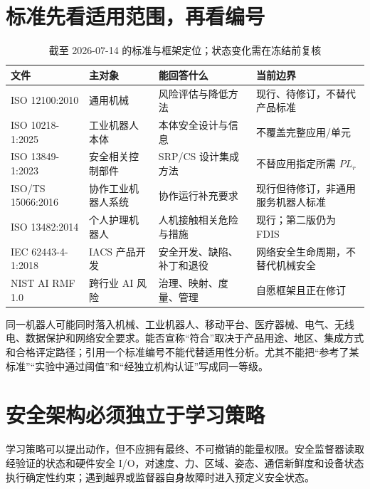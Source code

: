 \section{标准先看适用范围，再看编号}

\begin{table}[H]
\begingroup
{}
\centering
\caption{截至 2026-07-14 的标准与框架定位；状态变化需在冻结前复核}
\label{tab:safety-standards-scope}
\begin{tabularx}{\textwidth}{p{}YYp{0.20\textwidth}}
\toprule
文件 & 主对象 & 能回答什么 & 当前边界 \\
\midrule
ISO 12100:2010 & 通用机械 & 风险评估与降低方法 & 现行、待修订，不替代产品标准 \\
ISO 10218-1:2025 & 工业机器人本体 & 本体安全设计与信息 & 不覆盖完整应用/单元\cite{iso10218_1_2025} \\
ISO 13849-1:2023 & 安全相关控制部件 & SRP/CS 设计集成方法 & 不替应用指定所需 $PL_r$\cite{iso13849_1_2023} \\
ISO/TS 15066:2016 & 协作工业机器人系统 & 协作运行补充要求 & 现行但待修订，非通用服务机器人标准\cite{isots15066_2016} \\
ISO 13482:2014 & 个人护理机器人 & 人机接触相关危险与措施 & 现行；第二版仍为 FDIS\cite{iso13482_2014} \\
IEC 62443-4-1:2018 & IACS 产品开发 & 安全开发、缺陷、补丁和退役 & 网络安全生命周期，不替代机械安全\cite{iec62443_4_1_2018} \\
NIST AI RMF 1.0 & 跨行业 AI 风险 & 治理、映射、度量、管理 & 自愿框架且正在修订\cite{nist2023airmf} \\
\bottomrule
\end{tabularx}
\endgroup
\end{table}

同一机器人可能同时落入机械、工业机器人、移动平台、医疗器械、电气、无线电、数据保护和网络安全要求。能否宣称“符合”取决于产品用途、地区、集成方式和合格评定路径；引用一个标准编号不能代替适用性分析。尤其不能把“参考了某标准”“实验中通过阈值”和“经独立机构认证”写成同一等级。

\section{安全架构必须独立于学习策略}

学习策略可以提出动作，但不应拥有最终、不可撤销的能量权限。安全监督器读取经验证的状态和硬件安全 I/O，对速度、力、区域、姿态、通信新鲜度和设备状态执行确定性约束；遇到越界或监督器自身故障时进入预定义安全状态。

